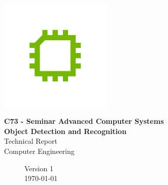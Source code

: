 \documentclass[openany]{scrreprt}
\begin{document}
\begin{titlepage}
	\flushright
	\includegraphics[width=0.4\textwidth]{./data/CE_Logo.png}\par\vspace{0cm}
	\Large{\textbf{\textcolor{htwgrey}{C73 - Seminar Advanced Computer Systems}}}\\
	\Large{\textbf{\textcolor{htwgrey}{Object Detection and Recognition}}}\\
	\Large{\textcolor{htwgreen}{Technical Report}}\\
	\Large{\textcolor{htwgrey}{Computer Engineering}}\\
	\begin{figure}[b]
	\flushright
	Version 1 \ \\
	\today{}
	\end{figure}
\end{titlepage}

\tableofcontents

\newpage

%
%
%
%
%
%
%
%
%
%
%
%
\end{document}

